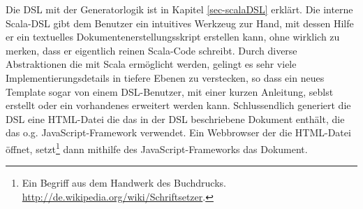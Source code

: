 Die DSL mit der Generatorlogik ist in Kapitel \ref{sec-scalaDSL} erklärt.
Die interne Scala-DSL gibt dem Benutzer ein intuitives Werkzeug zur Hand,
mit dessen Hilfe er ein textuelles Dokumentenerstellungsskript erstellen kann,
ohne wirklich zu merken, dass er eigentlich reinen Scala-Code schreibt.
Durch diverse Abstraktionen die mit Scala ermöglicht werden, gelingt es
sehr viele Implementierungsdetails in tiefere Ebenen zu verstecken, so
dass ein neues Template sogar von einem DSL-Benutzer, mit einer kurzen
Anleitung, seblst erstellt oder ein vorhandenes erweitert werden kann.
Schlussendlich generiert die DSL eine HTML-Datei die das in der DSL
beschriebene Dokument enthält, die das o.g. JavaScript-Framework verwendet.
Ein Webbrowser der die HTML-Datei öffnet, setzt\footnote{
Ein Begriff aus dem Handwerk des Buchdrucks.
\url{http://de.wikipedia.org/wiki/Schriftsetzer}.}
dann mithilfe des JavaScript-Frameworks das Dokument.
